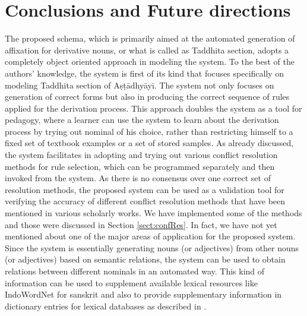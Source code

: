 \documentclass[a4paper,11pt,twoside,openright]{report}
\begin{document}
\section{Conclusions and Future directions}
\label{sect:conc}
The proposed schema, which is primarily aimed at the automated generation of affixation for derivative nouns, or what is called as Taddhita section, adopts a completely object oriented approach in modeling the system. To the best of the authors' knowledge, the system is first of its kind that focuses specifically on modeling Taddhita section of Aṣṭādhyāyī. The system not only focuses on generation of correct forms but also in producing the correct sequence of rules applied for the derivation process. This approach doubles the system as a tool for pedagogy, where a learner can use the system to learn about the derivation process by trying out nominal of his choice, rather than restricting himself to a fixed set of textbook examples or a set of stored samples. As already discussed, the system facilitates in adopting and trying out various conflict resolution methods for rule selection, which can be programmed separately and then invoked from the system. As there is no consensus over one correct set of resolution methods, the proposed system can be used as a validation tool for verifying the accuracy of different conflict resolution methods that have been mentioned in various scholarly works. We have implemented some of the methods and those were discussed in Section \ref{sect:confRes}. In fact, we have not yet mentioned about one of the major areas of application for the proposed system. Since the system is essentially generating nouns (or adjectives) from other nouns (or adjectives) based on semantic relations, the system can be used to obtain relations between different nominals in an automated way. This kind of information can be used to supplement available lexical resources like IndoWordNet for sanskrit \cite{pushpak10} and also to provide supplementary information in dictionary entries for lexical databases as described in .
\\ \\
\end{document}
